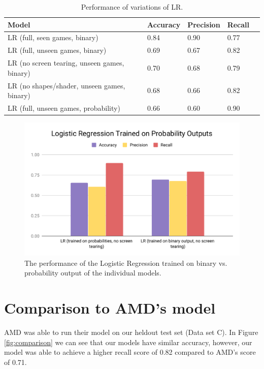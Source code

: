
\begin{table}
\centering
\begin{tabular}{@{}lllll@{}}
\toprule
Model & Accuracy & Precision & Recall  \\ \midrule
LR (full, seen games, binary) & 0.84 & 0.90 & 0.77\\
LR (full, unseen games, binary)& 0.69 & 0.67 & 0.82\\
LR (no screen tearing, unseen games, binary) & 0.70 & 0.68 & 0.79\\
LR (no shapes/shader, unseen games, binary) & 0.68 & 0.66 & 0.82\\
LR (full, unseen games, probability) & 0.66 & 0.60 &  0.90\\\bottomrule
\end{tabular}
\caption{Performance of variations of LR.}
\label{tab:variation}
\end{table}

\begin{figure}
    \centering
    \includegraphics[scale=0.7]{images/probability.pdf}
    \caption[Performance of logistic regression on probability output]{The performance of the Logistic Regression trained on binary vs. probability output of the individual models.}
    \label{fig:probability}
\end{figure}




\section{Comparison to AMD's model}
AMD was able to run their model on our heldout test set (Data set C). In Figure \ref{fig:comparison} we can see that our models have similar accuracy, however, our model was able to achieve a higher recall score of 0.82 compared to AMD's score of 0.71.

